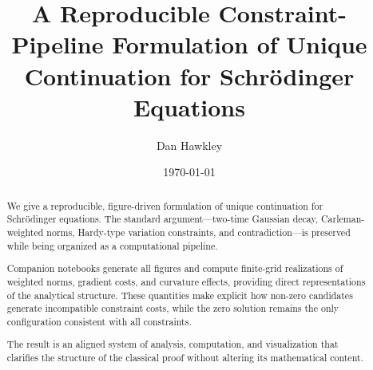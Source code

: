 \documentclass[11pt]{article}
\title{A Reproducible Constraint-Pipeline Formulation of Unique Continuation for Schrödinger Equations}
\author{Dan Hawkley}
\date{\today}
\begin{document}
\maketitle

\begin{abstract}
We give a reproducible, figure-driven formulation of unique continuation for Schrödinger equations.
The standard argument—two-time Gaussian decay, Carleman-weighted norms, Hardy-type variation constraints, and contradiction—is preserved while being organized as a computational pipeline.

Companion notebooks generate all figures and compute finite-grid realizations of weighted norms, gradient costs, and curvature effects, providing direct representations of the analytical structure. 
These quantities make explicit how non-zero candidates generate incompatible constraint costs, while the zero solution remains the only configuration consistent with all constraints.

The result is an aligned system of analysis, computation, and visualization that clarifies the structure of the classical proof without altering its mathematical content.
\end{abstract}








\appendix



\end{document}
